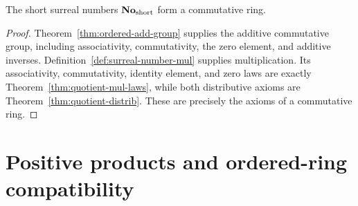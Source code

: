 \begin{theorem}
  \label{thm:comm-ring}
  \leanok
  The short surreal numbers \(\mathbf{No}_{\mathrm{short}}\) form a commutative ring.
\end{theorem}
\begin{proof}
  \leanok
  Theorem~\ref{thm:ordered-add-group} supplies the additive commutative group,
  including associativity, commutativity, the zero element, and additive
  inverses.  Definition~\ref{def:surreal-number-mul} supplies multiplication.
  Its associativity, commutativity, identity element, and zero laws are exactly
  Theorem~\ref{thm:quotient-mul-laws}, while both distributive axioms are
  Theorem~\ref{thm:quotient-distrib}.  These are precisely the axioms of a
  commutative ring.
\end{proof}

\section{Positive products and ordered-ring compatibility}

